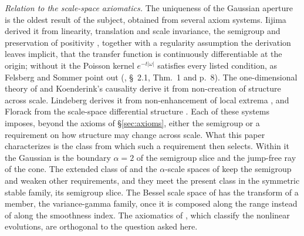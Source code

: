 \emph{Relation to the scale-space axiomatics.} The uniqueness of the Gaussian aperture is
the oldest result of the subject, obtained from several axiom systems. Iijima derived it
from linearity, translation and scale invariance, the semigroup and preservation of
positivity , together with a regularity
assumption the derivation leaves implicit, that the transfer function is continuously
differentiable at the origin; without it the Poisson kernel $e^{-t|\omega|}$ satisfies
every listed condition, as Felsberg and Sommer point out
(, \S~2.1, Thm.~1 and p.~8). The one-dimensional theory of
 and Koenderink's causality
 derive it from non-creation of structure across scale.
Lindeberg derives it from non-enhancement of local extrema
, and Florack
from the scale-space differential structure . Each
of these systems imposes, beyond the axioms of \S\ref{sec:axioms}, either the semigroup or
a requirement on how structure may change across scale. What this paper characterizes is
the class from which such a requirement then selects. Within it the Gaussian is the boundary
$\alpha = 2$ of the semigroup slice and the jump-free ray of the cone. The extended class of
 and the $\alpha$-scale spaces of  keep
the semigroup and weaken other requirements, and they meet the present class in the
symmetric stable family, its semigroup slice. The Bessel scale space of
 has the transform of a member, the variance-gamma family, once
it is composed along the range instead of along the smoothness index. The axiomatics of , which
classify the nonlinear evolutions, are orthogonal to the question asked here.

